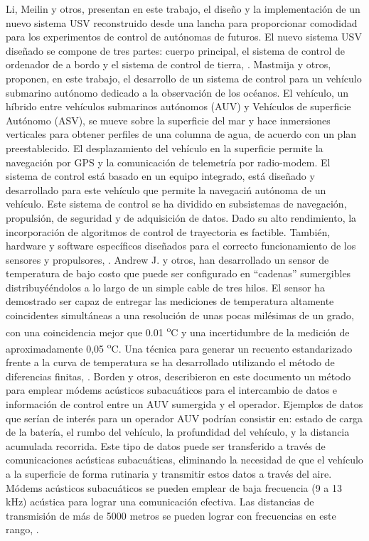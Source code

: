 Li, Meilin y otros, presentan en este trabajo, el dise\~no y la implementaci\'on de un nuevo sistema USV reconstruido desde una lancha para proporcionar comodidad para los experimentos de control de aut\'onomas de futuros. El nuevo sistema USV dise\~nado se compone de tres partes: cuerpo principal, el sistema de control de ordenador de a bordo y el sistema de control de tierra, \cite{li2012design}. 
Mastmija y otros, proponen, en este trabajo, el desarrollo de un sistema de control para un veh\'iculo submarino autónomo dedicado a la observaci\'on de los oc\'eanos. El veh\'iculo, un h\'ibrido entre veh\'iculos submarinos aut\'onomos (AUV) y Veh\'iculos de superficie Aut\'onomo (ASV), se mueve sobre la superficie del mar y hace inmersiones verticales para obtener perfiles de una columna de agua, de acuerdo con un plan preestablecido. El desplazamiento del veh\'iculo en la superficie permite la navegaci\'on por GPS y la comunicaci\'on de telemetr\'ia por radio-modem. El sistema de control est\'a basado en un equipo integrado, est\'a dise\~nado y desarrollado para este veh\'iculo que permite la navegaci\'n aut\'onoma de un veh\'iculo. Este sistema de control se ha dividido en subsistemas de navegaci\'on, propulsi\'on, de seguridad y de adquisici\'on de datos. Dado su alto rendimiento, la incorporaci\'on de algoritmos de control de trayectoria es factible. Tambi\'en, hardware y software espec\'ificos dise\~nados para el correcto funcionamiento de los sensores y propulsores, \cite{masmitja2010development}.
Andrew J. y otros, han desarrollado un sensor de temperatura de bajo costo que puede ser configurado en “cadenas” sumergibles distribuyé\'endolos a lo largo de un simple cable de tres hilos. El sensor ha demostrado ser capaz de entregar las mediciones de temperatura altamente coincidentes simult\'aneas a una resoluci\'on de unas pocas mil\'esimas de un grado, con una coincidencia mejor que 0.01  \textsuperscript{o}C y una incertidumbre de la medici\'on de aproximadamente 0,05  \textsuperscript{o}C. Una t\'ecnica para generar un recuento estandarizado frente a la curva de temperatura se ha desarrollado utilizando el m\'etodo de diferencias finitas, \cite{skinner2006using}.
Borden  y otros,  describieron en este documento un m\'etodo para emplear m\'odems ac\'usticos subacu\'aticos para el intercambio de datos e informaci\'on  de control entre un AUV sumergida y el operador. Ejemplos de datos que ser\'ian de  inter\'es para un operador AUV podr\'ian consistir en: estado de carga de la bater\'ia, el rumbo del veh\'iculo, la profundidad del veh\'iculo, y la distancia acumulada recorrida. Este  tipo de datos puede ser transferido a través de comunicaciones acústicas subacu\'aticas, eliminando la  necesidad de que el veh\'iculo a la superficie de forma rutinaria y transmitir estos datos a trav\'es del aire. M\'odems ac\'usticos subacuáticos se pueden emplear de baja frecuencia (9 a 13 kHz) ac\'ustica para lograr  una comunicación efectiva. Las distancias de transmisi\'on de m\'as de 5000 metros se  pueden lograr con frecuencias en este rango, \cite{borden2012long}.
